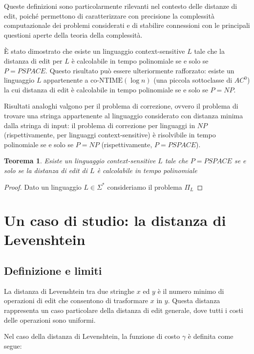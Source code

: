 \documentclass[a4paper,12pt]{report}
\newtheorem{theorem}{Teorema}[chapter]
\theoremstyle{propositionstyle}
\begin{document}
    Queste definizioni sono particolarmente rilevanti nel contesto delle distanze di edit, poiché permettono di caratterizzare con precisione la complessità computazionale dei problemi considerati e di stabilire connessioni con le principali questioni aperte della teoria della complessità.

    È stato dimostrato che esiste un linguaggio context-sensitive $L$ tale che la distanza di edit per $L$ è calcolabile in tempo polinomiale se e solo se $P = PSPACE$. Questo risultato può essere ulteriormente rafforzato: esiste un linguaggio $L$ appartenente a $\text{co-NTIME}(\log n)$ (una piccola sottoclasse di $AC^0$) la cui distanza di edit è calcolabile in tempo polinomiale se e solo se $P = NP$.

    Risultati analoghi valgono per il problema di correzione, ovvero il problema di trovare una stringa appartenente al linguaggio considerato con distanza minima dalla stringa di input: il problema di correzione per linguaggi in $NP$ (rispettivamente, per linguaggi context-sensitive) è risolvibile in tempo polinomiale se e solo se $P = NP$ (rispettivamente, $P = PSPACE$).

    \begin{theorem}
        Esiste un linguaggio context-sensitive $L$ tale che $P = PSPACE$ se e solo se la distanza di edit di $L$ è calcolabile in tempo polinomiale
    \end{theorem}
    \begin{proof}
        Dato un linguaggio $L \in \Sigma^*$ consideriamo il problema $\Pi_L$
    \end{proof}


    \chapter{Un caso di studio: la distanza di Levenshtein}

    \section{Definizione e limiti}

    La distanza di Levenshtein tra due stringhe $x$ ed $y$ è il numero minimo di operazioni di edit che consentono di trasformare $x$ in $y$. Questa distanza rappresenta un caso particolare della distanza di edit generale, dove tutti i costi delle operazioni sono uniformi.

    Nel caso della distanza di Levenshtein, la funzione di costo $\gamma$ è definita come segue:
\end{document}
